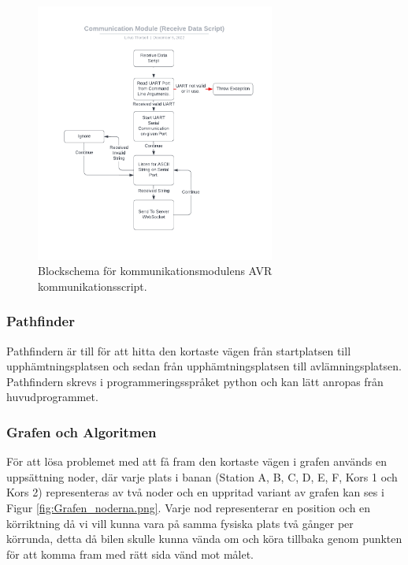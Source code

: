 \documentclass[10pt,oneside,swedish]{lips}
\begin{document}
\begin{figure}[htbp]
  \centering
  \includegraphics[width=0.7\textwidth]{./Figures/CM_Receive_Data_Script.png}
  \caption{Blockschema för kommunikationsmodulens AVR kommunikationsscript.}
  \label{fig:CM_Receive_Data_Script.png}
\end{figure}

\subsubsection{Pathfinder}
Pathfindern är till för att hitta den kortaste vägen från startplatsen till upphämtningsplatsen och sedan från upphämtningsplatsen till avlämningsplatsen. Pathfindern skrevs i programmeringsspråket python och kan lätt anropas från huvudprogrammet.

\subsubsection{Grafen och Algoritmen}

För att lösa problemet med att få fram den kortaste vägen i grafen används en uppsättning noder, där varje plats i banan (Station A, B, C, D, E, F, Kors 1 och Kors 2) representeras av två noder och en uppritad variant av grafen kan ses i Figur \ref{fig:Grafen_noderna.png}. Varje nod representerar en position och en körriktning då vi vill kunna vara på samma fysiska plats två gånger per körrunda, detta då bilen skulle kunna vända om och köra tillbaka genom punkten för att komma fram med rätt sida vänd mot målet. \\
\end{document}
